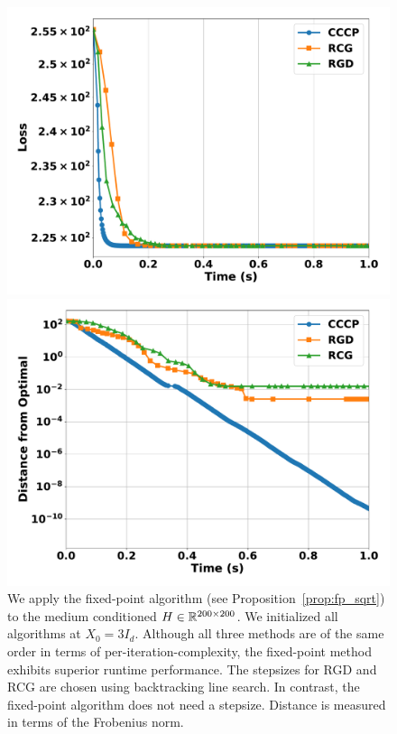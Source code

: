 \documentclass[sn-nature]{sn-jnl}%
\theoremstyle{thmstyleone}%
\theoremstyle{thmstyletwo}%
\theoremstyle{thmstylethree}%
\begin{document}
\begin{figure}[htbp]
  \centering
  \begin{minipage}[b]{0.45\textwidth}
    \centering
    \includegraphics[width=\textwidth]{figuresV2/square_root/loss_time_200_medium.pdf}
  \end{minipage}
  \hfill
  \begin{minipage}[b]{0.45\textwidth}
    \centering
    \includegraphics[width=\textwidth]{figuresV2/square_root/distance_time_200_medium.pdf}
  \end{minipage}
  \caption{We apply the fixed-point algorithm (see Proposition~\ref{prop:fp_sqrt}) to the medium conditioned $H \in \mathbb{R}^{200 \times 200}$. We initialized all algorithms at $X_0 = 3 I_d$. Although all three methods are of the same order in terms of per-iteration-complexity, the fixed-point method exhibits superior runtime performance. The stepsizes for RGD and RCG are chosen using backtracking line search. In contrast, the fixed-point algorithm does not need a stepsize. Distance is measured in terms of the Frobenius norm.}
    \label{fig: square_root_exp_medium}
\end{figure}
\end{document}
